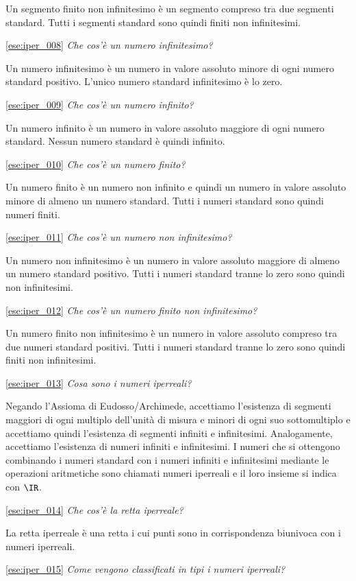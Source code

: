 Un segmento finito non infinitesimo è un segmento compreso tra due segmenti 
standard. Tutti i segmenti standard sono quindi finiti non infinitesimi.

\ref{ese:iper_008} 
\emph{Che cos'è un numero infinitesimo?}

Un numero infinitesimo è un numero in valore assoluto minore di ogni numero 
standard positivo. L'unico numero standard infinitesimo è lo zero.

\ref{ese:iper_009} 
\emph{Che cos'è un numero infinito?}

Un numero infinito è un numero in valore assoluto maggiore di ogni numero 
standard. Nessun numero standard è quindi infinito.

\ref{ese:iper_010} 
\emph{Che cos'è un numero finito?}

Un numero finito è un numero non infinito e quindi un numero in valore 
assoluto 
minore di almeno un numero standard. 
Tutti i numeri standard sono quindi numeri finiti.

\ref{ese:iper_011} 
\emph{Che cos'è un numero non infinitesimo?}

Un numero non infinitesimo è un numero in valore assoluto maggiore 
di almeno un numero standard positivo. 
Tutti i numeri standard tranne lo zero sono quindi non infinitesimi.

\ref{ese:iper_012} 
\emph{Che cos'è un numero finito non infinitesimo?}

Un numero finito non infinitesimo è un numero in valore assoluto compreso tra 
due numeri standard positivi. Tutti i numeri standard tranne lo zero sono 
quindi finiti non infinitesimi.

\ref{ese:iper_013} 
\emph{Cosa sono i numeri iperreali?}

Negando l'Assioma di Eudosso/Archimede, accettiamo l'esistenza di segmenti 
maggiori di ogni multiplo dell'unità di misura e minori di ogni suo 
sottomultiplo e accettiamo quindi l'esistenza di segmenti infiniti e 
infinitesimi. Analogamente, accettiamo l'esistenza di numeri infiniti e 
infinitesimi. I numeri che si ottengono combinando i numeri standard con i 
numeri infiniti e infinitesimi mediante le operazioni aritmetiche sono 
chiamati 
numeri iperreali e il loro insieme si indica con \(\IR\).

\ref{ese:iper_014} 
\emph{Che cos'è la retta iperreale?}

La retta iperreale è una retta i cui punti sono in corrispondenza biunivoca 
con i numeri iperreali.

\ref{ese:iper_015} 
\emph{Come vengono classificati in tipi i numeri iperreali?}


